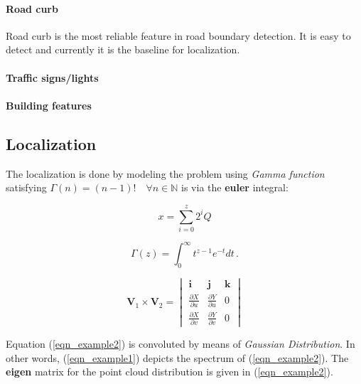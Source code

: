 \documentclass[10 pt,letterpaper,conference]{IEEEtran}
\begin{document}
\paragraph{Road curb}\label{road-curb}

Road curb is the most reliable feature in road boundary detection. It is
easy to detect and currently it is the baseline for localization.

\paragraph{Traffic signs/lights}\label{traffic-signslights}

\paragraph{Building features}\label{building-features}

\subsection{Localization}\label{localization}

The localization is done by modeling the problem using \emph{Gamma
function} satisfying \(\Gamma(n) = (n-1)!\quad\forall n\in\mathbb N\) is
via the \textbf{euler} integral:

\begin{equation}
\label{eqn_example1}
x = \sum\limits_{i=0}^{z} 2^{i}Q
\end{equation}

\begin{equation}
\label{eqn_example2}
\Gamma(z) = \int_0^\infty t^{z-1}e^{-t}dt\,.
\end{equation}

\begin{equation}
\label{eqn_example3}
\mathbf{V}_1 \times \mathbf{V}_2 =  \begin{vmatrix}
\mathbf{i} & \mathbf{j} & \mathbf{k} \\
\frac{\partial X}{\partial u} &  \frac{\partial Y}{\partial u} & 0 \\
\frac{\partial X}{\partial v} & \frac{\partial Y}{\partial v} & 0
\end{vmatrix}
\end{equation}

Equation (\ref{eqn_example2}) is convoluted by means of \emph{Gaussian
Distribution}. In other words, (\ref{eqn_example1}) depicts the spectrum
of (\ref{eqn_example2}). The \textbf{eigen }matrix for the point cloud
distribution is given in (\ref{eqn_example2}).
\end{document}
